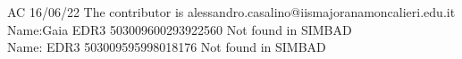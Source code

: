 AC 16/06/22 The contributor is alessandro.casalino@iismajoranamoncalieri.edu.it
Name:Gaia EDR3 503009600293922560 Not found in SIMBAD\\
Name: EDR3 503009595998018176 Not found in SIMBAD\\

